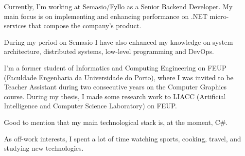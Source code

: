 

\begin{cvparagraph}


Currently, I'm working at Semasio/Fyllo as a Senior Backend Developer. My main focus is on implementing and enhancing performance on .NET micro-services that compose the company's product.

During my period on Semasio I have also enhanced my knowledge on system architecture, distributed systems, low-level programming and DevOps.

I'm a former student of Informatics and Computing Engineering on FEUP (Faculdade Engenharia da Universidade do Porto), where I was invited to be Teacher Assistant during two consecutive years on the Computer Graphics course.
During my thesis, I made some research work to LIACC (Artificial Intelligence and Computer Science Laboratory) on FEUP.

Good to mention that my main technological stack is, at the moment, C\#.

As off-work interests, I spent a lot of time watching sports, cooking, travel, and studying new technologies.

\end{cvparagraph}
